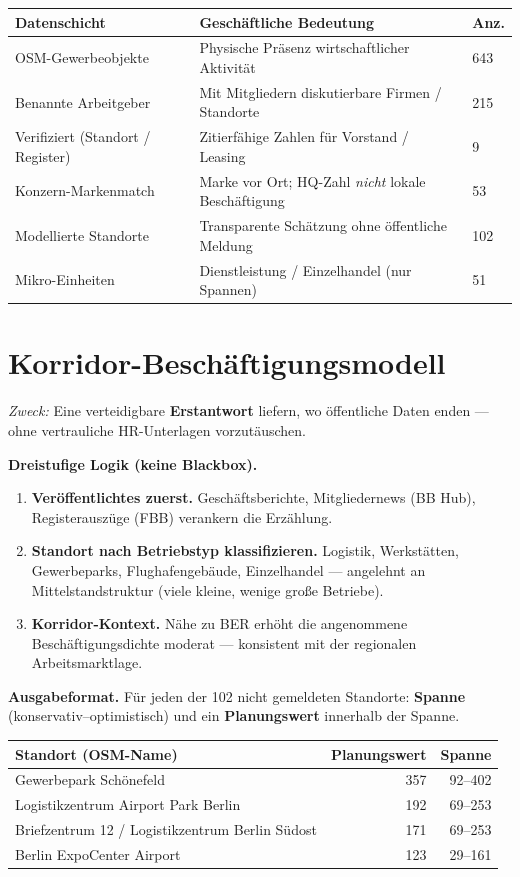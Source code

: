 \documentclass[11pt,a4paper,ngerman]{scrartcl}
\begin{document}
{\small
\begin{tabularx}{\linewidth}{@{}p{3.1cm}Xp{1.5cm}@{}}
\toprule
\textbf{Datenschicht} & \textbf{Geschäftliche Bedeutung} & \textbf{Anz.} \\
\midrule
OSM-Gewerbeobjekte & Physische Präsenz wirtschaftlicher Aktivität & 643 \\
Benannte Arbeitgeber & Mit Mitgliedern diskutierbare Firmen / Standorte & 215 \\
Verifiziert (Standort / Register) & Zitierfähige Zahlen für Vorstand / Leasing & 9 \\
Konzern-Markenmatch & Marke vor Ort; HQ-Zahl \textit{nicht} lokale Beschäftigung & 53 \\
Modellierte Standorte & Transparente Schätzung ohne öffentliche Meldung & 102 \\
Mikro-Einheiten & Dienstleistung / Einzelhandel (nur Spannen) & 51 \\
\bottomrule
\end{tabularx}
}

\section{Korridor-Beschäftigungsmodell}
\label{sec:modell}

\textit{Zweck:} Eine verteidigbare \textbf{Erstantwort} liefern, wo öffentliche Daten enden — ohne vertrauliche HR-Unterlagen vorzutäuschen.

\textbf{Dreistufige Logik (keine Blackbox).}
\begin{enumerate}
  \item \textbf{Veröffentlichtes zuerst.} Geschäftsberichte, Mitgliedernews (BB Hub), Registerauszüge (FBB) verankern die Erzählung.
  \item \textbf{Standort nach Betriebstyp klassifizieren.} Logistik, Werkstätten, Gewerbeparks, Flughafengebäude, Einzelhandel — angelehnt an Mittelstandstruktur (viele kleine, wenige große Betriebe).
  \item \textbf{Korridor-Kontext.} Nähe zu BER erhöht die angenommene Beschäftigungsdichte moderat — konsistent mit der regionalen Arbeitsmarktlage.
\end{enumerate}

\textbf{Ausgabeformat.} Für jeden der 102 nicht gemeldeten Standorte: \textbf{Spanne} (konservativ–optimistisch) und ein \textbf{Planungswert} innerhalb der Spanne.

\begin{center}
{\small
\begin{tabular}{lrr}
\toprule
\textbf{Standort (OSM-Name)} & \textbf{Planungswert} & \textbf{Spanne} \\
\midrule
Gewerbepark Schönefeld & 357 & 92--402 \\
Logistikzentrum Airport Park Berlin & 192 & 69--253 \\
Briefzentrum 12 / Logistikzentrum Berlin Südost & 171 & 69--253 \\
Berlin ExpoCenter Airport & 123 & 29--161 \\
\bottomrule
\end{tabular}
}
\end{center}
\end{document}
